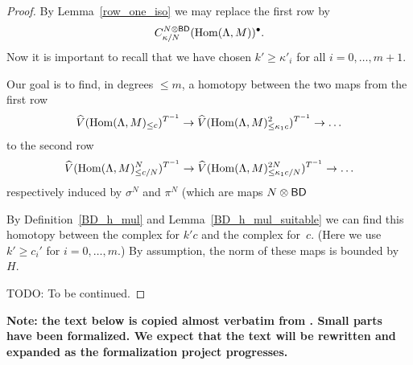 \begin{proof}
  By Lemma~\ref{row_one_iso} we may replace the first row by
  \[
    C^{N \otimes \mathsf{BD}}_{\kappa/N}(\operatorname{Hom}(\Lambda, M))^\bullet.
  \]
  Now it is important to recall that we have chosen $k' \ge \kappa'_i$ for all $i = 0, \dots, m+1$.

  Our goal is to find,
  in degrees $\leq m$, a homotopy between the two maps from the first row
  \[
    \widehat{V}(\operatorname{Hom}(\Lambda,M)_{\leq c})^{T^{-1}}\to \widehat{V}(\operatorname{Hom}(\Lambda,M)_{\leq \kappa_1c}^2)^{T^{-1}}\to \ldots
  \]
  to the second row
  \[
    \widehat{V}(\operatorname{Hom}(\Lambda,M)_{\leq c/N}^N)^{T^{-1}}\to \widehat{V}(\operatorname{Hom}(\Lambda,M)_{\leq \kappa_1c/N}^{2N})^{T^{-1}}\to \ldots
  \]
  respectively induced by $\sigma^N$ and $\pi^N$ (which are maps $N \otimes \mathsf{BD}$

  By Definition~\ref{BD_h_mul} and Lemma~\ref{BD_h_mul_suitable}
  we can find this homotopy between the complex for $k'c$ and the complex for~$c$.
  (Here we use $k'\geq c_i'$ for $i=0,\ldots,m$.)
  By assumption, the norm of these maps is bounded by~$H$.

  TODO: To be continued.
\end{proof}

\begin{remark}
  \label{boundary-text}
  \textbf{Note: the text below is copied almost verbatim from \cite{Analytic}.
  Small parts have been formalized.
  We expect that the text will be rewritten and expanded as the formalization project progresses.}
\end{remark}

